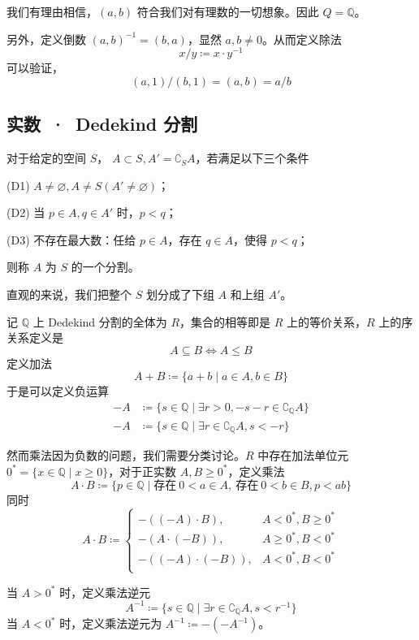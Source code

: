 我们有理由相信，$(a,b)$ 符合我们对有理数的一切想象。因此 $Q = \mathbb{Q}$。

另外，定义倒数 $(a,b)^{-1} = (b,a)$，显然 $a,b\ne 0$。从而定义除法
\[ x/y \coloneqq  x \cdot y^{-1}\]
可以验证，
\[ (a,1)/(b,1) = (a,b) = a/b\]

\subsection{实数\ ·\ Dedekind 分割}



\begin{definition}[Dedekind 分割]
	对于给定的空间 $S$， $A \subset S, A' = \complement_S A$，若满足以下三个条件

	(D1) $A \ne \varnothing, A \neq S(A' \ne \varnothing)$；

	(D2) 当 $p\in A,q \in A'$ 时，$p<q$；

	(D3) 不存在最大数：任给 $p \in A$，存在 $q \in A$，使得 $p<q$；

	则称 $A$ 为 $S$ 的一个分割。
\end{definition}

直观的来说，我们把整个 $S$ 划分成了下组 $A$ 和上组 $A'$。

记 $\mathbb{Q}$ 上 Dedekind 分割的全体为 $R$，集合的相等即是 $R$ 上的等价关系，$R$ 上的序关系定义是
\[ A \subseteq B \Leftrightarrow A\leqslant B \]
定义加法
\[ A+B \coloneqq  \{ a+b \mid a\in A,b\in B\} \]
于是可以定义负运算
\[ \begin{aligned}
		-A & \coloneqq  \{ s \in \mathbb{Q} \mid \exists r>0,-s-r\in \complement_\mathbb{Q} A\} \\
		-A & \coloneqq  \{ s \in \mathbb{Q} \mid \exists r\in \complement_\mathbb{Q} A,s < -r\}
	\end{aligned} \]


然而乘法因为负数的问题，我们需要分类讨论。$R$ 中存在加法单位元 $0^* = \{x \in \mathbb{Q} \mid x \geqslant 0\}$，对于正实数 $A,B\geqslant 0^*$，定义乘法
\[ A \cdot B \coloneqq  \{ p \in \mathbb{Q} \mid \text{存在}\ 0<a\in A,\ \text{存在}\ 0<b\in B, p<ab\}\]
同时
\[
	A \cdot B \coloneqq \begin{cases}
		-((-A) \cdot B),    & A<0^*, B\geqslant 0^* \\
		-(A \cdot (-B)),    & A\geqslant 0^*, B<0^* \\
		-((-A) \cdot (-B)), & A<0^*, B<0^*          \\
	\end{cases}
\]

当 $A > 0^*$ 时，定义乘法逆元
\[ A^{-1} \coloneqq  \{s \in \mathbb{Q} \mid \exists r \in \complement_\mathbb{Q} A, s < r^{-1}\}\]
当 $A < 0^*$ 时，定义乘法逆元为 $A^{-1} \coloneqq  -(-A^{-1})$。

